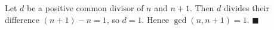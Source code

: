 Let $d$ be a positive common divisor of $n$ and $n+1$. Then $d$ divides their difference $(n+1)-n=1$, so $d=1$. Hence $\gcd(n,n+1)=1$. $\blacksquare$
